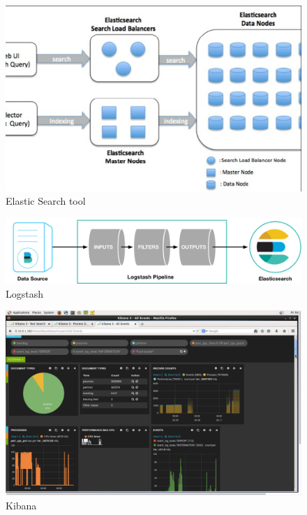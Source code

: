 \begin{figure}[!ht]
  \centering\includegraphics[width=\columnwidth]{image/elasticsearch.png}
  \caption{Elastic Search tool~\cite{hid-sp18-410-elk-comp1}}
\label{f:elasticsearch}
\end{figure}

\begin{figure}[!ht]
  \centering\includegraphics[width=\columnwidth]{image/logstash.png}
  \caption{Logstash~\cite{hid-sp18-410-elk-comp2}}\label{f:logstash}
\end{figure}

\begin{figure}[!ht]
  \centering\includegraphics[width=\columnwidth]{image/kibana.png}
  \caption{Kibana~\cite{hid-sp18-410-elk-comp3}}\label{f:kibana}
\end{figure}


